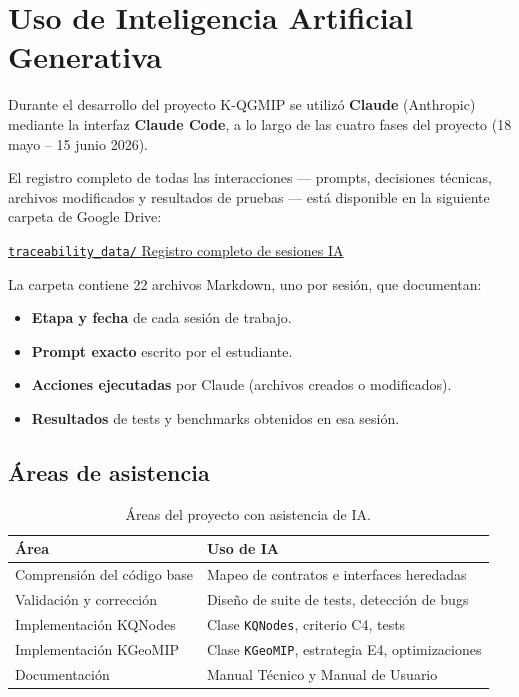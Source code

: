 
\section{Uso de Inteligencia Artificial Generativa}

Durante el desarrollo del proyecto K-QGMIP se utilizó
\textbf{Claude} (Anthropic) mediante la interfaz \textbf{Claude Code},
a lo largo de las cuatro fases del proyecto (18 mayo -- 15 junio 2026).

El registro completo de todas las interacciones --- prompts, decisiones
técnicas, archivos modificados y resultados de pruebas --- está
disponible en la siguiente carpeta de Google Drive:

\begin{center}
  \href{https://drive.google.com/drive/u/1/folders/1_O1T8vP5PjtyhC1141kj9PLuoT6PGLo8}%
  {\texttt{traceability\_data/} \textemdash{} Registro completo de sesiones IA}
\end{center}

La carpeta contiene 22 archivos Markdown, uno por sesión, que documentan:

\begin{itemize}
  \item \textbf{Etapa y fecha} de cada sesión de trabajo.
  \item \textbf{Prompt exacto} escrito por el estudiante.
  \item \textbf{Acciones ejecutadas} por Claude (archivos creados o modificados).
  \item \textbf{Resultados} de tests y benchmarks obtenidos en esa sesión.
\end{itemize}

\subsection*{Áreas de asistencia}

\begin{table}[H]
\centering
\begin{tabular}{ll}
  \toprule
  \textbf{Área} & \textbf{Uso de IA} \\
  \midrule
  Comprensión del código base & Mapeo de contratos e interfaces heredadas \\
  Validación y corrección & Diseño de suite de tests, detección de bugs \\
  Implementación KQNodes & Clase \texttt{KQNodes}, criterio C4, tests \\
  Implementación KGeoMIP & Clase \texttt{KGeoMIP}, estrategia E4, optimizaciones \\
  Documentación & Manual Técnico y Manual de Usuario \\
  \bottomrule
\end{tabular}
\caption{Áreas del proyecto con asistencia de IA.}
\label{tab:areas_ia}
\end{table}

